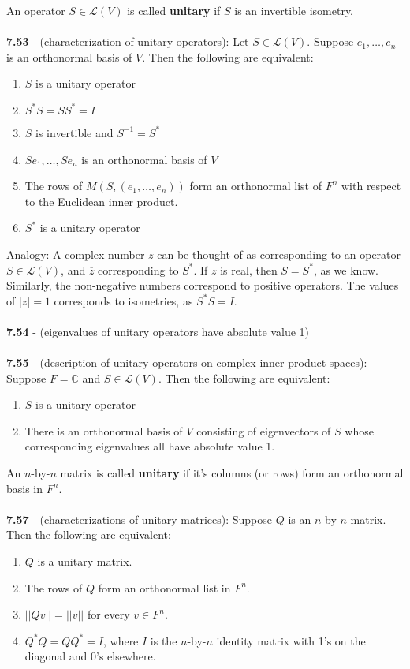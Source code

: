 \documentclass{article}
\theoremstyle{definition}
\begin{document}
An operator $S \in \mathcal{L}(V)$ is called \textbf{unitary} if $S$ is an invertible isometry. \\ \\
\textbf{7.53} - (characterization of unitary operators): Let $S \in \mathcal{L}(V)$. Suppose $e_1, \dots, e_n$ is an orthonormal basis of $V$. Then the following are equivalent: \begin{enumerate}
    \item $S$ is a unitary operator
    \item $S^*S = SS^* = I$
    \item $S$ is invertible and $S^{-1} = S^*$
    \item $Se_1, \dots, Se_n$ is an orthonormal basis of $V$
    \item The rows of $M(S, (e_1, \dots, e_n))$ form an orthonormal list of $F^n$ with respect to the Euclidean inner product.
    \item $S^*$ is a unitary operator
\end{enumerate} $ $ \\
Analogy: A complex number $z$ can be thought of as corresponding to an operator $S \in \mathcal{L}(V)$, and $\overline{z}$ corresponding to $S^*$. If $z$ is real, then $S = S^*$, as we know. Similarly, the non-negative numbers correspond to positive operators. The values of $|z| = 1$ corresponds to isometries, as $S^*S = I$.  \\ \\
\textbf{7.54} - (eigenvalues of unitary operators have absolute value 1) \\ \\
\textbf{7.55} - (description of unitary operators on complex inner product spaces): Suppose $F = \mathbb{C}$ and $S \in \mathcal{L}(V)$. Then the following are equivalent: \begin{enumerate}
    \item $S$ is a unitary operator
    \item There is an orthonormal basis of $V$ consisting of eigenvectors of $S$ whose corresponding eigenvalues all have absolute value 1.
\end{enumerate} $ $ \\
An $n$-by-$n$ matrix is called \textbf{unitary} if it's columns (or rows) form an orthonormal basis in $F^n$. \\ \\
\textbf{7.57} - (characterizations of unitary matrices): Suppose $Q$ is an $n$-by-$n$ matrix. Then the following are equivalent: \begin{enumerate}
    \item $Q$ is a unitary matrix.
    \item The rows of $Q$ form an orthonormal list in $F^n$.
    \item $||Qv|| = ||v||$ for every $v \in F^n$.
    \item $Q^*Q = QQ^* = I$, where $I$ is the $n$-by-$n$ identity matrix with 1's on the diagonal and 0's elsewhere.
\end{enumerate} $ $ \\
\end{document}
